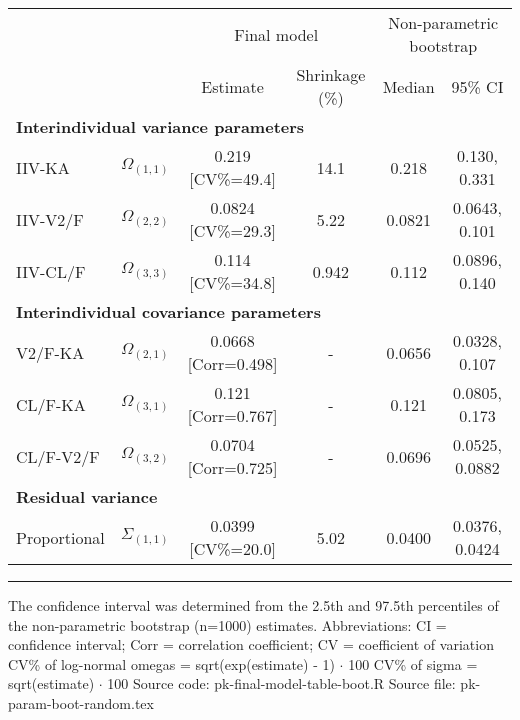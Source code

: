 \setlength{\tabcolsep}{5pt} 
\begin{threeparttable}
\renewcommand{\arraystretch}{1.3}
\begin{tabular}[h]{lccccc}
\hline
\multicolumn{2}{c}{} & \multicolumn{2}{c}{Final model} & \multicolumn{2}{c}{Non-parametric bootstrap} \\
\cmidrule(lr){3-4}
\cmidrule(lr){5-6}
 &  & Estimate & Shrinkage (\%) & Median & 95\% CI \\
\hline
\multicolumn{6}{l}{\textbf{Interindividual variance parameters}}\\%
IIV-KA & $\Omega_{(1,1)}$ & 0.219 [CV\%=49.4] & 14.1 & 0.218 & 0.130, 0.331 \\
IIV-V2/F & $\Omega_{(2,2)}$ & 0.0824 [CV\%=29.3] & 5.22 & 0.0821 & 0.0643, 0.101 \\
IIV-CL/F & $\Omega_{(3,3)}$ & 0.114 [CV\%=34.8] & 0.942 & 0.112 & 0.0896, 0.140 \\
\hline \multicolumn{6}{l}{\textbf{Interindividual covariance parameters}}\\%
V2/F-KA & $\Omega_{(2,1)}$ & 0.0668 [Corr=0.498] & - & 0.0656 & 0.0328, 0.107 \\
CL/F-KA & $\Omega_{(3,1)}$ & 0.121 [Corr=0.767] & - & 0.121 & 0.0805, 0.173 \\
CL/F-V2/F & $\Omega_{(3,2)}$ & 0.0704 [Corr=0.725] & - & 0.0696 & 0.0525, 0.0882 \\
\hline \multicolumn{6}{l}{\textbf{Residual variance}}\\%
Proportional & $\Sigma_{(1,1)}$ & 0.0399 [CV\%=20.0] & 5.02 & 0.0400 & 0.0376, 0.0424 \\
\hline
\end{tabular}
\end{threeparttable}
 
\vspace{0.67cm}
 
\begin{minipage}{1\linewidth}
\linespread{1.1}\selectfont
\rule{1\linewidth}{0.4pt}
\vspace{0.02cm}
The confidence interval was determined from the 
2.5th and 97.5th percentiles of the non-parametric 
bootstrap (n=1000) estimates. \newline
Abbreviations: CI = confidence interval; 
                        Corr = correlation coefficient;
                        CV = coefficient of variation \newline
CV\% of log-normal omegas = sqrt(exp(estimate) - 1) $\cdot$ 100 \newline
CV\% of sigma = sqrt(estimate) $\cdot$ 100 \newline
Source code: pk-final-model-table-boot.R \newline
Source file: pk-param-boot-random.tex \newline
\end{minipage}
